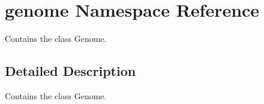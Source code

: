 \hypertarget{namespacegenome}{}\section{genome Namespace Reference}
\label{namespacegenome}


Contains the class Genome.  




\subsection{Detailed Description}
Contains the class Genome. 


